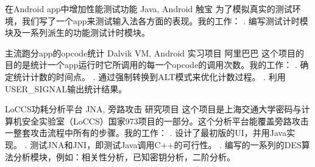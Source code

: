 \documentclass[11pt,a4paper]{moderncv}
\begin{document}
{在Android app中增加性能测试功能}
{Java, Android}{}
{触宝}
{
为了模拟真实的测试环境，我们写了一个app来测试输入法各方面的表现。我的工作：
. 编写测试计时模块及一系列派生的功能测试计时模块。
\newline 
}

{主流跑分app的opcode统计}
{Dalvik VM, Android}
{实习项目}
{阿里巴巴}
{
这个项目的目的是统计一个app运行时它所调用的每一个opcode的调用次数。我的工作：
. 确定统计计数的时间点。
. 通过强制转换到ALT模式来优化计数过程。
. 利用USER\_SIGNAL输出统计结果。
\newline 
}

{LoCCS功耗分析平台}
{JNA, 旁路攻击}
{研究项目}{}
{
这个项目是上海交通大学密码与计算机安全实验室（LoCCS）国家973项目的一部分。这个分析平台能覆盖旁路攻击一整套攻击流程中所有的步骤。我的工作：
. 设计了最初版的UI，并用Java实现。
. 测试JNA和JNI，即测试Java调用C++的可行性。
. 编写的一系列的DES算法分析模块，例如：相关性分析，已知密钥分析，二阶分析。
\newline 
}
\end{document}
